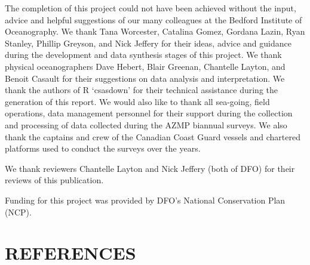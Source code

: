 \documentclass[12pt]{article}\usepackage[]{graphicx}\usepackage[]{color}
\begin{document}
The completion of this project could not have been achieved without the input, advice and helpful suggestions of our many colleagues at the Bedford Institute of Oceanography. We thank Tana Worcester, Catalina Gomez, Gordana Lazin, Ryan Stanley, Phillip Greyson, and Nick Jeffery for their ideas, advice and guidance during the development and data synthesis stages of this project. We thank physical oceanographers Dave Hebert, Blair Greenan, Chantelle Layton, and Benoit Casault for their suggestions on data analysis and interpretation. We thank the authors of R `csasdown' for their technical assistance during the generation of this report. We would also like to thank all sea-going, field operations, data management personnel for their support during the collection and processing of data collected during the AZMP biannual surveys. We also thank the captains and crew of the Canadian Coast Guard vessels and chartered platforms used to conduct the surveys over the years.

We thank reviewers Chantelle Layton and Nick Jeffery (both of DFO) for their reviews of this publication.

Funding for this project was provided by DFO's National Conservation Plan (NCP).

\clearpage

\clearpage

\hypertarget{sec:references}{%
\section{REFERENCES}\label{sec:references}}

\noindent \vspace{-2em} \setlength{\parindent}{-0.2in} \setlength{\leftskip}{0.2in} \setlength{\parskip}{8pt}
\end{document}
